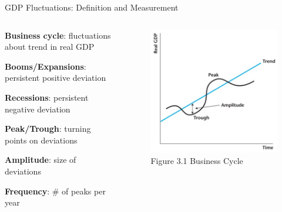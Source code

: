 \documentclass[11pt,aspectratio=169,usenames,dvipsnames]{beamer}
\let\tempone\itemize
\let\temptwo\enditemize
\renewenvironment{itemize}{\tempone\addtolength{\itemsep}{\fill}}{\temptwo}
\begin{document}
\begin{frame}{GDP Fluctuations: Definition and Measurement}
\label{slide:GDP_Fluctuations__Definition_and_Measurement}
    \begin{columns}
        \begin{column}{0.5\textwidth}
            \begin{itemize}
                \item \textbf{Business cycle}: fluctuations about trend in real GDP
                \item \textbf{Booms/Expansions}: persistent \alert{positive} deviation
                \item \textbf{Recessions}: persistent \alert{negative} deviation
                \item \textbf{Peak/Trough}: turning points on deviations
                \item \textbf{Amplitude}: size of deviations
                \item \textbf{Frequency}: \# of peaks per year
            \end{itemize}
        \end{column}
        \begin{column}{0.5\textwidth}
            \begin{figure}
                \caption{Figure 3.1 Business Cycle}
                \includegraphics[width=.85\textwidth]{./figures/Fugre3_1.jpg}
            \end{figure}
        \end{column}
    \end{columns}
\end{frame}
\end{document}
